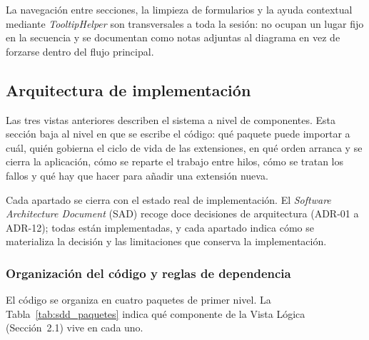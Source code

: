 \documentclass[12pt,letterpaper,oneside]{article}
\DeclareRobustCommand{\_}{\textunderscore\allowbreak}
\begin{document}
La navegaci\'on entre secciones, la limpieza de formularios y la ayuda contextual mediante \textit{Tooltip\-Helper} son transversales a toda la sesi\'on: no ocupan un lugar fijo en la secuencia y se documentan como notas adjuntas al diagrama en vez de forzarse dentro del flujo principal.

\subsection{Arquitectura de implementación}
\label{sec:sdd_arq_impl}

Las tres vistas anteriores describen el sistema a nivel de componentes. Esta sección baja al nivel en que se escribe el código: qué paquete puede importar a cuál, quién gobierna el ciclo de vida de las extensiones, en qué orden arranca y se cierra la aplicación, cómo se reparte el trabajo entre hilos, cómo se tratan los fallos y qué hay que hacer para añadir una extensión nueva.

Cada apartado se cierra con el estado real de implementación. El \textit{Software Architecture Document} (SAD) recoge doce decisiones de arquitectura (ADR-01 a ADR-12); todas están implementadas, y cada apartado indica cómo se materializa la decisión y las limitaciones que conserva la implementación.

\subsubsection{Organización del código y reglas de dependencia}

El código se organiza en cuatro paquetes de primer nivel. La Tabla~\ref{tab:sdd_paquetes} indica qué componente de la Vista Lógica (Sección~2.1) vive en cada uno.
\end{document}
